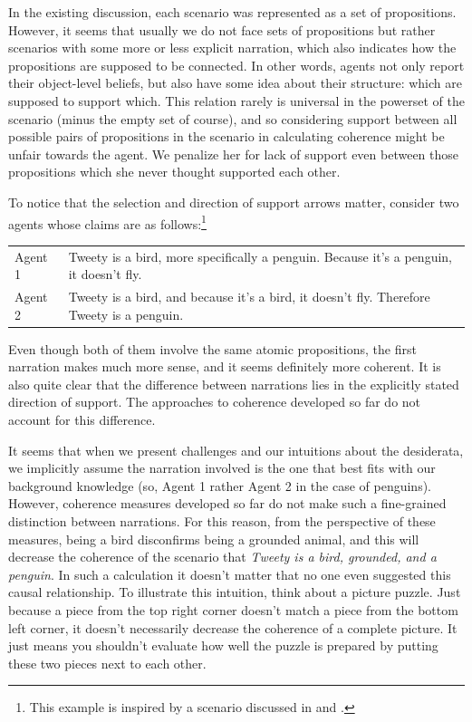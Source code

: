 \documentclass[10pt,]{scrartcl}
\begin{document}
In the existing discussion, each scenario was represented as a set of
propositions. However, it seems that usually we do not face sets of
propositions but rather scenarios with some more or less explicit
narration, which also indicates how the propositions are supposed to be
connected. In other words, agents not only report their object-level
beliefs, but also have some idea about their structure: which are
supposed to support which. This relation rarely is universal in the
powerset of the scenario (minus the empty set of course), and so
considering support between all possible pairs of propositions in the
scenario in calculating coherence might be unfair towards the agent. We
penalize her for lack of support even between those propositions which
she never thought supported each other.

To notice that the selection and direction of support arrows matter, 
consider two agents whose claims are as follows:\footnote{This example is inspired by a scenario discussed in \citep[50]{bovens2004bayesian} and \citep{Meijs2007Alleged}.}

\vspace{2mm}

\begin{center}
\begin{tabular}{lp{9cm}}
\textsf{Agent 1}     & Tweety is a bird, more specifically a penguin. Because it’s a penguin, it doesn’t fly.  \\
\textsf{Agent 2}     &  Tweety is a bird, and because it’s a bird, it doesn't fly. Therefore Tweety is a penguin. \\
\end{tabular}
\end{center}

\vspace{2mm}

\noindent Even though both of them involve the same atomic propositions,
the first narration makes much more sense, and it seems definitely more
coherent. It is also quite clear that the difference between narrations
lies in the explicitly stated direction of support. The approaches to
coherence developed so far do not account for this difference.

It seems that when we present challenges and our intuitions
about the desiderata, we implicitly assume the narration involved is the
one that best fits with our background knowledge (so, Agent 1 rather
Agent 2 in the case of penguins). However, coherence measures developed
so far do not make such a fine-grained distinction between narrations. For this reason, from the perspective of these measures,  being a
bird disconfirms being a grounded animal, and this will decrease the coherence of  the scenario that \textit{Tweety is  a bird,
grounded, and a penguin}. In such a calculation it
doesn't matter that no one even suggested this causal relationship. To
illustrate this intuition, think about a picture puzzle. Just because a
piece from the top right corner doesn't match a piece from the bottom
left corner, it doesn't necessarily decrease the coherence of a complete
picture. It just means you shouldn't evaluate how well the puzzle is
prepared by putting these two pieces next to each other.
\end{document}

